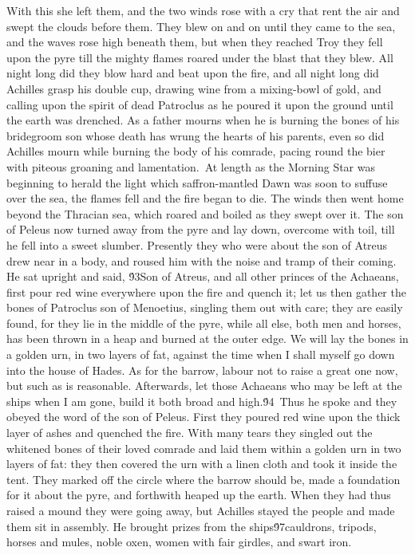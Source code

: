 {With this she left them, and the two winds rose with a cry that rent the air and swept the clouds before them. They blew on and on until they came to the sea, and the waves rose high beneath them, but when they reached Troy they fell upon the pyre till the mighty flames roared under the blast that they blew. All night long did they blow hard and beat upon the fire, and all night long did Achilles grasp his double cup, drawing wine from a mixing-bowl of gold, and calling upon the spirit of dead Patroclus as he poured it upon the ground until the earth was drenched. As a father mourns when he is burning the bones of his bridegroom son whose death has wrung the hearts of his parents, even so did Achilles mourn while burning the body of his comrade, pacing round the bier with piteous groaning and lamentation.\
At length as the Morning Star was beginning to herald the light which saffron-mantled Dawn was soon to suffuse over the sea, the flames fell and the fire began to die. The winds then went home beyond the Thracian sea, which roared and boiled as they swept over it. The son of Peleus now turned away from the pyre and lay down, overcome with toil, till he fell into a sweet slumber. Presently they who were about the son of Atreus drew near in a body, and roused him with the noise and tramp of their coming. He sat upright and said, \'93Son of Atreus, and all other princes of the Achaeans, first pour red wine everywhere upon the fire and quench it; let us then gather the bones of Patroclus son of Menoetius, singling them out with care; they are easily found, for they lie in the middle of the pyre, while all else, both men and horses, has been thrown in a heap and burned at the outer edge. We will lay the bones in a golden urn, in two layers of fat, against the time when I shall myself go down into the house of Hades. As for the barrow, labour not to raise a great one now, but such as is reasonable. Afterwards, let those Achaeans who may be left at the ships when I am gone, build it both broad and high.\'94\
Thus he spoke and they obeyed the word of the son of Peleus. First they poured red wine upon the thick layer of ashes and quenched the fire. With many tears they singled out the whitened bones of their loved comrade and laid them within a golden urn in two layers of fat: they then covered the urn with a linen cloth and took it inside the tent. They marked off the circle where the barrow should be, made a foundation for it about the pyre, and forthwith heaped up the earth. When they had thus raised a mound they were going away, but Achilles stayed the people and made them sit in assembly. He brought prizes from the ships\'97cauldrons, tripods, horses and mules, noble oxen, women with fair girdles, and swart iron.\
}
